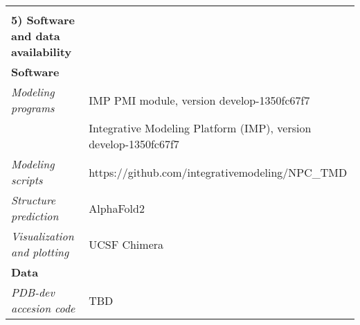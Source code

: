 \documentclass[11pt,a4paper]{article}
\begin{document}
\begin{landscape}
\begin{longtable}{ p{} | p{} }
   &  \\
  \normalsize{\textbf{5) Software and data availability}} & \\
    \hline
   \textbf{Software} & \\
   \hline
             \textit{Modeling programs} & IMP PMI module, version develop-1350fc67f7\\
             & Integrative Modeling Platform (IMP), version develop-1350fc67f7 \\
                  \textit{Modeling scripts} & https://github.com/integrativemodeling/NPC\_TMD\\
                  \textit{Structure prediction} & AlphaFold2\\
                  \textit{Visualization and plotting} & UCSF Chimera\\
          \hline

  \textbf{Data} & \\
    \hline
            \textit{PDB-dev accesion code} & TBD\\
          \hline
  
\end{longtable}
\end{landscape}
\end{document}
